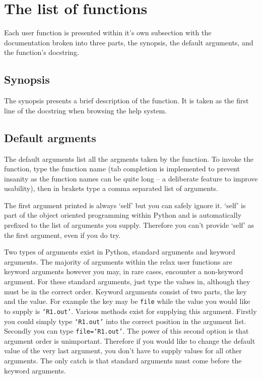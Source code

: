 \documentclass[a4paper, 11pt, twoside]{book}
\begin{document}
\section{The list of functions}

Each user function is presented within it's own subsection with the documentation broken into three parts, the synopsis, the default arguments, and the function's docstring.


\subsection{Synopsis}

The synopsis presents a brief description of the function.  It is taken as the first line of the docstring when browsing the help system.


\subsection{Default argments}

The default arguments list all the argments taken by the function.  To invoke the function, type the function name (tab completion is implemented to prevent insanity as the function names can be quite long -- a deliberate feature to improve usability), then in brakets type a comma separated list of arguments.

The first argument printed is always `self' but you can safely ignore it.  `self' is part of the object oriented programming within Python and is automatically prefixed to the list of arguments you supply.  Therefore you can't provide `self' as the first argument, even if you do try.

Two types of arguments exist in Python, standard arguments and keyword arguments.  The majority of arguments within the relax user functions are keyword arguments however you may, in rare cases, encounter a non-keyword argument.  For these standard arguments, just type the values in, although they must be in the correct order.  Keyword arguments consist of two parts, the key and the value.  For example the key may be \texttt{file} while the value you would like to supply is \texttt{`R1.out'}.  Various methods exist for supplying this argument.  Firstly you could simply type \texttt{`R1.out'} into the correct position in the argument list.  Secondly you can type \texttt{file=`R1.out'}.  The power of this second option is that argument order is unimportant.  Therefore if you would like to change the default value of the very last argument, you don't have to supply values for all other arguments.  The only catch is that standard arguments must come before the keyword arguments.



\end{document}

